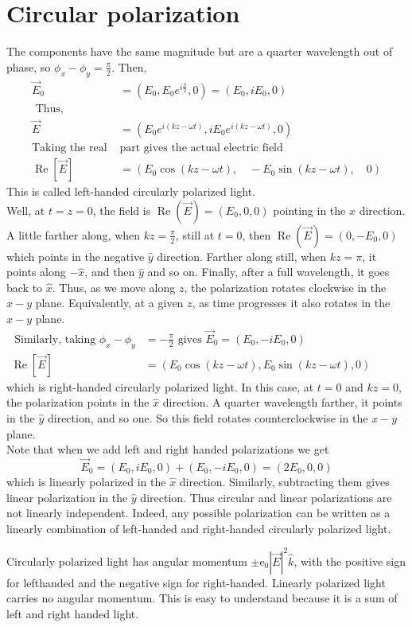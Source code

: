  \section{ Circular polarization}
 The components have the same magnitude but are a quarter wavelength out of phase, so $\phi_{x}-\phi_{y}=\frac{\pi}{2}$. Then,
 \begin{align*}
 \vec{E}_{0}&=\left(E_{0}, E_{0} e^{i \frac{\pi}{2}}, 0\right)=\left(E_{0}, i E_{0}, 0\right)\\
\text{ Thus,}\\
 \vec{E}&=\left(E_{0} e^{i(k z-\omega t)}, i E_{0} e^{i(k z-\omega t)}, 0\right)\\
 \text{Taking the real }&\text{part gives the actual electric field}\\
 \operatorname{Re}[\vec{E}]&=\left(E_{0} \cos (k z-\omega t), \quad-E_{0} \sin (k z-\omega t), \quad 0\right)
 \end{align*}
 This is called left-handed circularly polarized light.\\
  Well, at $t=z=0$, the field is $\operatorname{Re}(\vec{E})=\left(E_{0}, 0,0\right)$ pointing in the $x$ direction. A little farther along, when $k z=\frac{\pi}{2}$, still at $t=0$, then $\operatorname{Re}(\vec{E})=\left(0,-E_{0}, 0\right)$ which points in the negative $\hat{y}$ direction. Farther along still, when $k z=\pi$, it points along $-\hat{x}$, and then $\hat{y}$ and so on. Finally, after a full wavelength, it goes back to $\hat{x}$. Thus, as we move along $z$, the polarization rotates clockwise in the $x-y$ plane. Equivalently, at a given $z$, as time progresses it also rotates in the $x-y$ plane.\\
 $\begin{aligned}
 	\text { Similarly, taking } \phi_{x}-\phi_{y} &=-\frac{\pi}{2} \text { gives } \vec{E}_{0}=\left(E_{0},-i E_{0}, 0\right) \\
 	\operatorname{Re}[\vec{E}] &=\left(E_{0} \cos (k z-\omega t), E_{0} \sin (k z-\omega t), 0\right)
 \end{aligned}$\\
 which is right-handed circularly polarized light. In this case, at $t=0$ and $k z=0$, the polarization points in the $\hat{x}$ direction. A quarter wavelength farther, it points in the $\hat{y}$ direction, and so one. So this field rotates counterclockwise in the $x-y$ plane.\\
 Note that when we add left and right handed polarizations we get
 $$
 \vec{E}_{0}=\left(E_{0}, i E_{0}, 0\right)+\left(E_{0},-i E_{0}, 0\right)=\left(2 E_{0}, 0,0\right)
 $$
 which is linearly polarized in the $\hat{x}$ direction. Similarly, subtracting them gives linear polarization in the $\hat{y}$ direction. Thus circular and linear polarizations are not linearly independent. Indeed, any possible polarization can be written as a linearly combination of left-handed and right-handed circularly polarized light.
 \begin{note}
 	Circularly polarized light has angular momentum $\pm \mathrm{e}_{0}|\vec{E}|^{2} \hat{k}$, with the positive sign for lefthanded and the negative sign for right-handed. Linearly polarized light carries no angular momentum. This is easy to understand because it is a sum of left and right handed light.
 \end{note}
